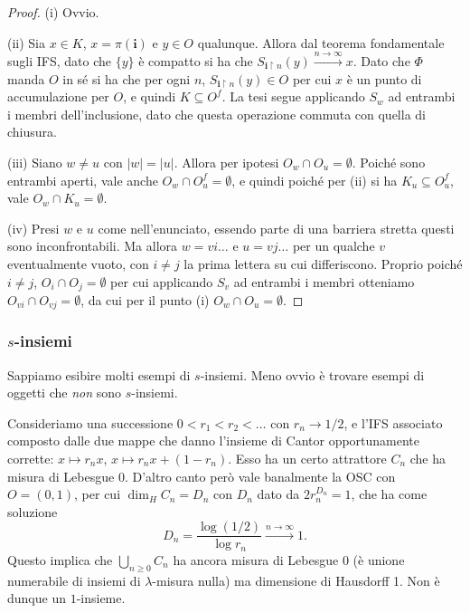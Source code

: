 \begin{proof}
	(i) Ovvio. 
	
	(ii) Sia $x\in K$, $x = \pi(\mathbf i)$ e $y\in O$ qualunque. Allora dal teorema fondamentale sugli IFS, dato che $\{y\}$ è compatto si ha che $S_{\mathbf i\upharpoonright n}(y)\xrightarrow{n\to\infty} x$. Dato che $\Phi$ manda $O$ in sé si ha che per ogni $n$, $S_{\mathbf i\upharpoonright n}(y)\in O$ per cui $x$ è un punto di accumulazione per $O$, e quindi $K\subseteq O^{f}$. La tesi segue applicando $S_{w}$ ad entrambi i membri dell'inclusione, dato che questa operazione commuta con quella di chiusura. 
	
	(iii) Siano $w\neq u$ con $|w| = |u|$. Allora per ipotesi $O_{w}\cap O_{u} = \emptyset$. Poiché sono entrambi aperti, vale anche $O_{w}\cap O_{u}^{f} = \emptyset$, e quindi poiché per (ii) si ha $K_{u}\subseteq O_{u}^{f}$, vale $O_{w}\cap K_{u} = \emptyset$.
	
	(iv) Presi $w$ e $u$ come nell'enunciato, essendo parte di una barriera stretta questi sono inconfrontabili. Ma allora $w = vi\dots$ e $u = vj\dots$ per un qualche $v$ eventualmente vuoto, con $i\neq j$ la prima lettera su cui differiscono. Proprio poiché $i\neq j$, $O_{i}\cap O_{j} = \emptyset$ per cui applicando $S_{v}$ ad entrambi i membri otteniamo $O_{vi}\cap O_{vj} = \emptyset$, da cui per il punto (i) $O_{w}\cap O_{u} = \emptyset$.
\end{proof}


\subsubsection*{$s$-insiemi}

Sappiamo esibire molti esempi di $s$-insiemi. Meno ovvio è trovare esempi di oggetti che \emph{non} sono $s$-insiemi.

\begin{esempio}
	Consideriamo una successione $0<r_{1}<r_{2}<\dots$ con $r_{n}\to1/2$, e l'IFS associato composto dalle due mappe che danno l'insieme di Cantor opportunamente corrette: $x\mapsto r_{n}x$, $x\mapsto r_{n}x + (1-r_{n})$.
	Esso ha un certo attrattore $C_{n}$ che ha misura di Lebesgue 0. D'altro canto però vale banalmente la OSC con $O = (0,1)$, per cui $\dim_{H}C_{n} = D_{n}$ con $D_{n}$ dato da $2r_{n}^{D_{n}} = 1$, che ha come soluzione 
	$$D_{n} = \frac{\log(1/2)}{\log r_{n}}\xrightarrow{n\to\infty}1.$$
	Questo implica che $\bigcup_{n\geq0}C_{n}$ ha ancora misura di Lebesgue 0 (è unione numerabile di insiemi di $\lambda$-misura nulla) ma dimensione di Hausdorff 1. Non è dunque un $1$-insieme.
\end{esempio}

